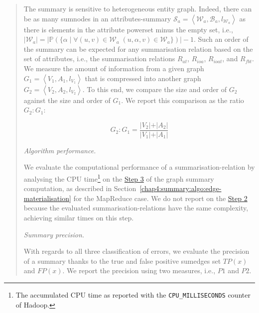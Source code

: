 \begin{quotation}
	The summary is sensitive to heterogeneous entity graph. Indeed, there can be as many sumnodes in an \gls{attributes-summary} $\mathcal{S}_a = \left\langle \mathcal{W}_{a}, \mathcal{B}_{a}, l_{\mathcal{W}_{a}} \right\rangle$ as there is elements in the attribute powerset minus the empty set, i.e., $\vert \mathcal{W}_a \vert = \vert \mathbb{P} \left( \{ \alpha \mid \forall (u, v) \in \mathcal{W}_a\; (u, \alpha, v) \in \mathcal{W}_a \} \right) \vert - 1$. Such an order of the summary can be expected for any summarisation relation based on the set of \gls{attributes}, i.e., the summarisation relations $R_{at}$, $R_{ioa}$, $R_{ioat}$, and $R_{fbt}$.\\

	We measure the amount of information from a given graph $G_1 = \left\langle V_1, A_1, l_{V_1} \right\rangle$ that is compressed into another graph $G_2 = \left\langle V_2, A_2, l_{V_2} \right\rangle$. To this end, we compare the size and order of $G_2$ against the size and order of $G_1$. We report this comparison as the ratio $G_2:G_1$:

	$$
	G_2:G_1 = \frac{\vert V_2 \vert + \vert A_2 \vert}{\vert V_1 \vert + \vert A_1 \vert}
	$$

	\item[\emph{Algorithm performance.}]

	We evaluate the computational performance of a \gls{summarisation-relation} by analysing the CPU time\footnote{The accumulated CPU time as reported with the \texttt{CPU\_MILLISECONDS} counter of Hadoop.} on the \hyperref[step-he]{Step 3} of the graph summary computation, as described in Section~\ref{chap4:summary:algo:edge-materialisation} for the MapReduce case. We do not report on the \hyperref[step-hn]{Step 2} because the evaluated \glspl{summarisation-relation} have the same complexity, achieving similar times on this step.

	\item[\emph{Summary precision.}]

	With regards to all three classification of errors, we evaluate the precision of a summary thanks to the true and false positive sumedges set $TP(x)$ and $FP(x)$.
	We report the precision using two measures, i.e., $P1$ and $P2$.


\end{quotation}
